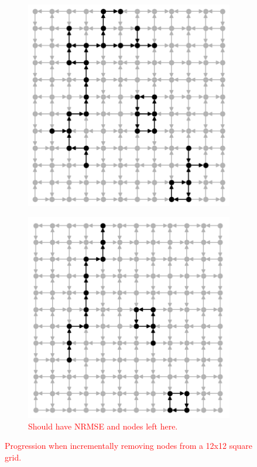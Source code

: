 \begin{figure}[t]
  \begin{subfigure}{.40\textwidth}
    \centering
    \includegraphics[width=1.0\linewidth]{figures/sq-grid-35.png}
    \caption{}
    \label{fig:sq-grid-35}
  \end{subfigure}
  \begin{subfigure}{.40\textwidth}
    \centering
    \includegraphics[width=1.0\linewidth]{figures/sq-grid-20.png}
    \caption{\textcolor{red}{Should have NRMSE and nodes left here.}}
    \label{fig:sq-grid-20}
  \end{subfigure}
  \caption{
    \textcolor{red}{
      Progression when incrementally removing nodes from a 12x12 square grid.
    }
  }
  \label{fig:sq-grid}
\end{figure}

